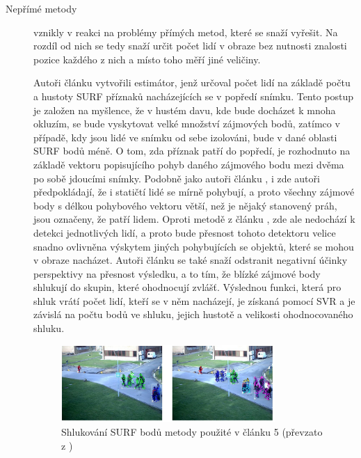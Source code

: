 \begin{description}
\item[Nepřímé metody] vznikly v reakci na problémy přímých metod, které se snaží vyřešit.
Na rozdíl od nich se tedy snaží určit počet lidí v obraze bez nutnosti znalosti pozice každého z nich a místo toho měří jiné veličiny.

Autoři článku \cite{crowd_on_pets} vytvořili estimátor, jenž určoval počet lidí na základě počtu a hustoty SURF příznaků nacházejících se v popředí snímku.
Tento postup je založen na myšlence, že v hustém davu, kde bude docházet k mnoha okluzím, se bude vyskytovat velké množství zájmových bodů, zatímco v případě, kdy jsou lidé ve snímku od sebe izolováni, bude v dané oblasti SURF bodů méně.
O tom, zda příznak patří do popředí, je rozhodnuto na základě vektoru popisujícího pohyb daného zájmového bodu mezi dvěma po sobě jdoucími snímky.
Podobně jako autoři článku \cite{head_and_shoulders}, i zde autoři předpokládají, že i statičtí lidé se mírně pohybují, a proto všechny zájmové body s délkou pohybového vektoru větší, než je nějaký stanovený práh, jsou označeny, že patří lidem.
Oproti metodě z článku \cite{head_and_shoulders}, zde ale nedochází k detekci jednotlivých lidí, a proto bude přesnost tohoto detektoru velice snadno ovlivněna výskytem jiných pohybujících se objektů, které se mohou v obraze nacházet.
Autoři článku se také snaží odstranit negativní účinky perspektivy na přesnost výsledku, a to tím, že blízké zájmové body shlukují do skupin, které ohodnocují zvlášť.
Výslednou funkci, která pro shluk vrátí počet lidí, kteří se v něm nacházejí, je získaná pomocí SVR a je závislá na počtu bodů ve shluku, jejich hustotě a velikosti ohodnocovaného shluku.

\begin{figure}[h!]
	\centering
	\includegraphics[width=0.8\textwidth]{Figures/history/PETS_CLUSTERS.png}
	\caption{Shlukování SURF bodů metody použité v článku 5 \cite{crowd_on_pets} (převzato z \cite{crowd_on_pets})}
	\label{fig:PETS}
\end{figure}

\end{description}


